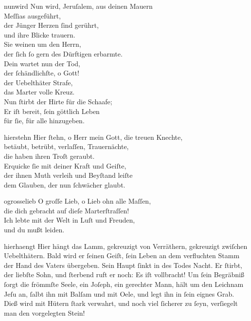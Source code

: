 \documentclass[tocstyle=ref-genre]{ees}
\begin{document}
{  \begin{movement}{nunwird}
    \voice[Basso]
    Nun wird, Jeruſalem, aus deinen Mauern\\
    Meſſias ausgeführt,\\
    der Jünger Herzen ſind gerührt,\\
    und ihre Blicke trauern.\\
    Sie weinen um den Herrn,\\
    der ſich ſo gern des Dürftigen erbarmte.\\
    Dein wartet nun der Tod,\\
    der ſchändlichſte, o Gott!\\
    der Uebelthäter Strafe,\\
    das Marter volle Kreuz.\\
    Nun ſtirbt der Hirte für die Schaafe;\\
    Er iſt bereit, ſein göttlich Leben\\
    für ſie, für alle hinzugeben.
  \end{movement}

  \begin{movement}{hierstehn}
    \voice[Coro]
    Hier ſtehn, o Herr mein Gott, die treuen Knechte,\\
    betäubt, betrübt, verlaſſen, Trauernächte,\\
    die haben ihren Troſt geraubt.\\[1ex]
    Erquicke ſie mit deiner Kraft und Geiſte,\\
    der ihnen Muth verleih und Beyſtand leiſte\\
    dem Glauben, der nun ſchwächer glaubt.
  \end{movement}

  \begin{movement}{ogrosselieb}
    \voice[Coro]
    O groſſe Lieb, o Lieb ohn alle Maſſen,\\
    die dich gebracht auf dieſe Marterſtraſſen!\\
    Ich lebte mit der Welt in Luſt und Freuden,\\
    und du mußt leiden.
  \end{movement}

  \begin{movement}{hierhaengt}
    \voice[Tenore]
    Hier hängt das Lamm,
    gekreuzigt von Verräthern,
    gekreuzigt zwiſchen Uebelthätern.
    Bald wird er ſeinen Geiſt, ſein Leben
    an dem verfluchten Stamm
    der Hand des Vaters übergeben.
    Sein Haupt ſinkt in des Todes Nacht.
    Er ſtirbt, der liebſte Sohn,
    und ſterbend ruft er noch:
    Es iſt vollbracht!
    Um ſein Begräbniß ſorgt die frömmſte Seele,
    ein Joſeph, ein gerechter Mann,
    hält um den Leichnam Jeſu an,
    ſalbt ihn mit Balſam und mit Oele,
    und legt ihn in ſein eignes Grab.
    Dieß wird mit Hütern ſtark verwahrt,
    und noch viel ſicherer zu ſeyn,
    verſiegelt man den vorgelegten Stein!
  \end{movement}

}
\end{document}
